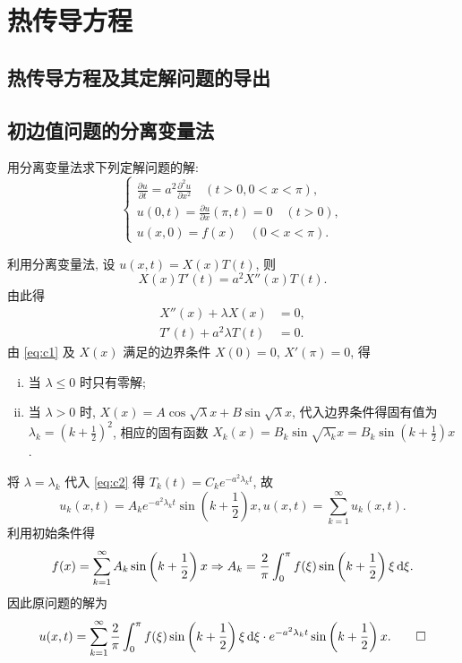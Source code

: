 \chapter{热传导方程}

\section{热传导方程及其定解问题的导出}

\section{初边值问题的分离变量法}


\begin{exercise}
  用分离变量法求下列定解问题的解:
  \[\begin{cases}
    \frac{\partial u}{\partial t} = a^2 \frac{\partial^2u}{\partial x^2}
      \quad (t>0, 0<x<\pi), \\
    u(0,t) = \frac{\partial u}{\partial x}(\pi,t) = 0\quad (t>0), \\
    u(x,0) = f(x)\quad (0<x<\pi).
  \end{cases}\]
\end{exercise}

\begin{solution}
  利用分离变量法, 设 $u(x,t)=X(x)T(t)$, 则
  \[X(x)T'(t) = a^2X''(x)T(t).\]
  由此得
  \begin{align}
    X''(x)+\lambda X(x) & = 0, \label{eq:c1} \\
    T'(t)+a^2\lambda T(t) & = 0. \label{eq:c2} 
  \end{align}
  由 \eqref{eq:c1} 及 $X(x)$ 满足的边界条件 $X(0)=0$, $X'(\pi)=0$, 得
  \begin{enumerate}[(i)]
    \item 当 $\lambda\leq 0$ 时只有零解;
    \item 当 $\lambda>0$ 时, $X(x)=A\cos\sqrt{\lambda}x+B\sin\sqrt{\lambda}x$,
      代入边界条件得固有值为 $\lambda_k=\left(k+\frac{1}{2}\right)^2$,
      相应的固有函数 $X_k(x)=B_k\sin\sqrt{\lambda_k}x=B_k\sin\left(k+\frac{1}{2}\right)x$.
  \end{enumerate}
  将 $\lambda=\lambda_k$ 代入 \eqref{eq:c2} 得 $T_k(t)=C_ke^{-a^2\lambda_kt}$, 故
  \[u_k(x,t) = A_ke^{-a^2\lambda_kt}\sin\left(k+\frac{1}{2}\right)x,u(x,t)
    = \sum_{k=1}^{\infty}u_k(x,t).\]
  利用初始条件得
  \[f(x) = \sum_{k=1}^{\infty}A_k\sin\left(k+\frac{1}{2}\right)x\Rightarrow A_k
    = \frac{2}{\pi}\int_0^{\pi}f(\xi)\sin\left(k+\frac{1}{2}\right)\xi\mathop{}\!\mathrm{d}\xi.\]
  因此原问题的解为
  \[u(x,t) = \sum_{k=1}^{\infty}\frac{2}{\pi}\int_0^{\pi} f(\xi)\sin\left(k+\frac{1}{2}\right)
    \xi\mathop{}\!\mathrm{d}\xi\cdot e^{-a^2\lambda_kt}\sin\left(k+\frac{1}{2}\right)x. \qedhere\]
\end{solution}


